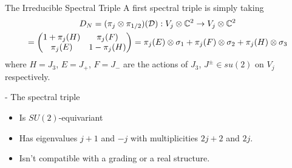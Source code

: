 \begin{frame}{The Irreducible Spectral Triple} %
A first spectral triple is simply taking 
\begin{multline}
    D_N = (\pi_j \otimes \pi_{1/2})(\mathcal D): V_j \otimes \mathbb C^2 \to V_j \otimes \mathbb C^2 \\= \begin{pmatrix} 1 + \pi_j(H) & \pi_j(F) \\ \pi_j(E) & 1 - \pi_j(H)\end{pmatrix} = \pi_j(E) \otimes \sigma_1 + \pi_j(F) \otimes \sigma_2 + \pi_j(H) \otimes \sigma_3
\end{multline} where $H = J_3$, $E = J_+$, $F = J_-$ are the actions of $J_3$, $J^\pm \in su(2)$ on $V_j$ respectively.

- The spectral triple 
    \begin{itemize}
        
    \item Is $SU(2)$-equivariant
    
    \item Has eigenvalues $j+1$ and $-j$ with multiplicities $2j+2$ and $2j$.
        
    \item Isn't compatible with a grading or a real structure.
    \end{itemize}

\end{frame}

